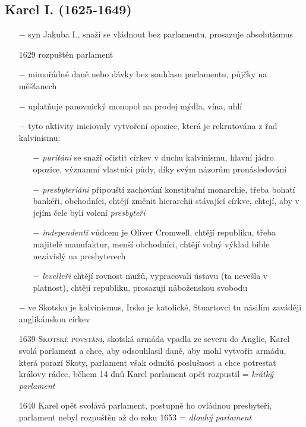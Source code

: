 \documentclass{article}
\begin{document}
\subsection*{Karel I. (1625-1649)}
\begin{itemize}
    \vspace{-0.5em}
    \setlength\itemsep{0.15em}
    \item[$-$] syn Jakuba I., snaží se vládnout bez parlamentu, prosazuje absolutismus
    \item[1629] rozpuštěn parlament
    \item[$-$] mimořádné daně nebo dávky bez souhlasu parlamentu, půjčky na měšťanech
    \item[$-$] uplatňuje panovnický monopol na prodej mýdla, vína, uhlí
    \item[$-$] tyto aktivity iniciovaly vytvoření opozice, která je rekrutována z řad kalvinismu:
    \begin{itemize}
        \vspace{-0.5em}
        \setlength\itemsep{0.15em}
        \item[$-$] \textit{puritáni} se snaží očistit církev v duchu kalvinismu, hlavní jádro opozice, významní vlastníci půdy, díky svým názorům pronásledováni
        \item[$-$] \textit{presbyteriáni} připouští zachování konstituční monarchie, třeba bohatí bankéři, obchodníci, chtějí změnit hierarchii stávající církve, chtejí, aby v jejím čele byli volení \textit{presbyteři}
        \item[$-$] \textit{independenti} vůdcem je Oliver Cromwell, chtějí republiku, třeba majitelé manufaktur, menší obchodníci, chtějí volný výklad bible nezávislý na presbyterech
        \item[$-$] \textit{levelleři} chtějí rovnost mužů, vypracovali ústavu (ta nevešla v platnost), chtějí republiku, prosazují náboženskou svobodu
    \end{itemize}
    \item[$-$] ve Skotsku je kalvinismus, Irsko je katolické, Stuartovci tu násilím zaváději anglikánskou církev
    \item[1639] \textsc{Skotské povstání}, skotská armáda vpadla ze severu do Anglie, Karel svolá parlament a chce, aby odsouhlasil daně, aby mohl vytvořit armádu, která porazí Skoty, parlament však odmítá poslušnost a chce potrestat královy rádce, během 14 dnů Karel parlament opět rozpustil = \textit{krátký parlament}
    \item[1640] Karel opět svolává parlament, postupně ho ovládnou presbyteři, parlament nebyl rozpuštěn až do roku 1653 = \textit{dlouhý parlament}

\end{itemize}
\end{document}
